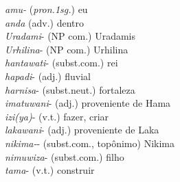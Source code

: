 
\normalsize
\noindent \emph{amu-} (\emph{pron.1sg.}) eu\\
\noindent \emph{anda} (adv.) dentro\\
\noindent \emph{Uradami}- (NP com.) Uradamis\\
\noindent \emph{Urhilina}- (NP com.) Urhilina\\
\noindent \emph{hantawati}- (subst.com.) rei\\
\noindent \emph{hapadi}- (adj.) fluvial\\
\noindent \emph{harnisa}- (subst.neut.) fortaleza\\
\noindent \emph{imatuwani}- (adj.) proveniente de Hama\\
\noindent \emph{izi{(ya)}}- (v.t.) fazer, criar\\
\noindent \emph{lakawani}- (adj.) proveniente de Laka\\
\noindent \emph{nikima-}- (subst.com., topônimo) Nikima\\
\noindent \emph{nimuwiza}- (subst.com.) filho\\
\noindent \emph{tama}- (v.t.) construir
